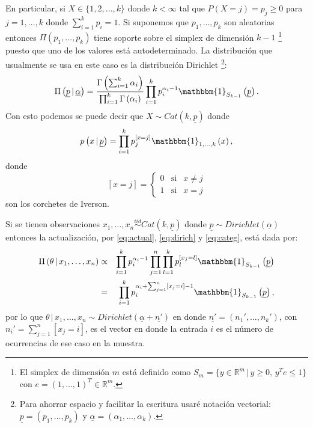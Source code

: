 En particular, si $X \in \{1, 2, \ldots, k\}$ donde $k < \infty$ tal que %
$P\left( X = j \right) = p_{j} \geq 0$ para $j = 1, \ldots, k$ donde %
$\sum_{i = 1}^{k} p_{i} = 1$. Si suponemos que $p_{1}, \ldots, p_{k}$ son aleatorias entonces %
$\Pi\left( p_{1}, \ldots, p_{k} \right)$ tiene soporte sobre el simplex de dimensión $k-1$%
\footnote{El simplex de dimensión $m$ está definido como %
$S_{m} = \{y \in \mathbb{R}^{m} \,|\, y \geq 0,\, y^{T}e \leq 1\}$ %
con $e = (1, \ldots, 1)^{T} \in \mathbb{R}^{m}$.} %
puesto que uno de los valores está autodeterminado.
%
La distribución que usualmente se usa en este caso es la distribución Dirichlet%
\footnote{Para ahorrar espacio y facilitar la escritura usaré notación vectorial: %
$\underline{p} = \left( p_{1}, \ldots, p_{k}\right)$ y %
$\underline{\alpha} = \left( \alpha_{1}, \ldots, \alpha_{k}\right)$.}:
%
\begin{equation} \label{eq:dirich}
\Pi\left( \underline{p} \,|\, \underline{\alpha} \right) = %
\frac{\Gamma\left( \sum_{i = 1}^{k} \alpha_{i} \right)}%
{\prod_{i=1}^{k} \Gamma\left( \alpha_{i} \right)} %
\prod_{i=1}^{k} p_{i}^{\alpha_{i} - 1} %
\mathbbm{1}_{S_{k-1}}\left(\underline{p}\right).
\end{equation}
%
Con esto podemos se puede decir que $X \sim Cat\left(k, \underline{p} \right)$ donde
%
\begin{equation} \label{eq:categ}
p\left( x \,|\, \underline{p} \right) = \prod_{i = 1}^{k} p_{j}^{\left[x = j\right]} %
\mathbbm{1}_{1, \ldots, k}\left(x\right),
\end{equation}
%
donde 
%
\[
\left[ x = j \right] = \left\{ \begin{array}{lcl} %
0 & \text{si} & x \neq j \\
1 & \text{si} & x = j
\end{array}
\right.
\]
%
son los corchetes de Iverson.

Si se tienen observaciones $x_{1}, \ldots, x_{n} \stackrel{iid}{\sim} %
Cat\left( k, \underline{p} \right)$ donde $\underline{p} \sim %
Dirichlet\left( \underline{\alpha} \right)$ entonces la actualización, por %
\eqref{eq:actual}, \eqref{eq:dirich} y \eqref{eq:categ}, está dada por:
%
\begin{eqnarray*}
\Pi\left( \theta \,|\, x_{1}, \ldots, x_{n} \right) & \propto & %
\prod_{i = 1}^{k} p_{i}^{\alpha_{i} - 1} %
\prod_{j = 1}^{n} \prod_{l = 1}^{k} p_{l}^{\left[ x_{j} = l \right]} %
\mathbbm{1}_{S_{k-1}}\left( \underline{p} \right) \\
& = & \prod_{i = 1}^{k} p_{i}^{\alpha_{i} + %
\sum_{j = 1}^{n} \left[ x_{j} = i \right] - 1} %
\mathbbm{1}_{S_{k-1}}\left( \underline{p} \right),
\end{eqnarray*}
%
por lo que $\theta \,|\, x_{1}, \ldots, x_{n} \sim %
Dirichlet\left( \underline{\alpha} + \underline{n'} \right)$ en donde %
$\underline{n'} = \left(n_{1}', \ldots, n_{k}' \right)$, con %
$n_{i}' = \sum_{j = 1}^{n} \left[ x_{j} = i \right] $, es el vector en donde la entrada $i$%
es el número de ocurrencias de ese caso en la muestra.

